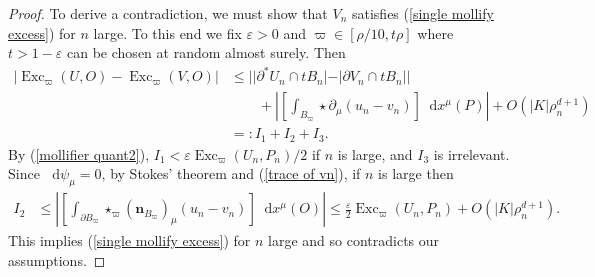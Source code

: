 \documentclass[reqno,11pt]{amsart}
\DeclareMathOperator{\Exc}{Exc}
\newcommand*\dif{\mathop{}\!\mathrm{d}}
\newcommand{\normal}{\mathbf n}
\theoremstyle{definition}
\numberwithin{equation}{section}
\begin{document}
\begin{proof}
To derive a contradiction, we must show that $V_n$ satisfies (\ref{single mollify excess}) for $n$ large.
To this end we fix $\varepsilon > 0$ and $\varpi \in [\rho/10, t\rho]$ where $t > 1 - \varepsilon$ can be chosen at random almost surely.
Then
\begin{align*}
    |\Exc_\varpi(U, O) - \Exc_\varpi(V, O)|
    &\leq ||\partial^* U_n \cap t B_n| - |\partial V_n \cap t B_n||\\
    &\qquad + \left|\left[\int_{B_\varpi} \star \partial_\mu(u_n - v_n) \right] \dif x^\mu(P)\right| + O(|K| \rho_n^{d + 1}) \\
    &=: I_1 + I_2 + I_3.
\end{align*}
By (\ref{mollifier quant2}), $I_1 < \varepsilon \Exc_\varpi(U_n, P_n)/2$ if $n$ is large, and $I_3$ is irrelevant.
Since $\dif \psi_\mu = 0$, by Stokes' theorem and (\ref{trace of vn}), if $n$ is large then
\begin{align*}
    I_2 &\leq \left|\left[\int_{\partial B_\varpi} \star_\varpi (\normal_{B_\varpi})_\mu (u_n - v_n)\right] \dif x^\mu(O)\right| \leq \frac{\varepsilon}{2} \Exc_\varpi(U_n, P_n) + O(|K| \rho_n^{d + 1}).
\end{align*}
This implies (\ref{single mollify excess}) for $n$ large and so contradicts our assumptions.
\end{proof}
\end{document}
